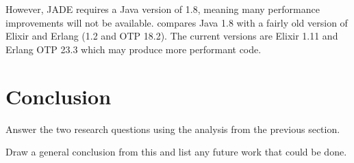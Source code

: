 \documentclass[12pt,a4paper]{article}
\begin{document}
However, JADE requires a Java version of 1.8, meaning many performance improvements will not be available.
 compares Java 1.8 with a fairly old version of Elixir and Erlang (1.2 and OTP 18.2).
The current versions are Elixir 1.11 and Erlang OTP 23.3 which may produce more performant code.

\section{Conclusion}

Answer the two research questions using the analysis from the previous section.

Draw a general conclusion from this and list any future work that could be done.

\setlength{\bibitemsep}{0.5\baselineskip}




\pagebreak

\end{document}
